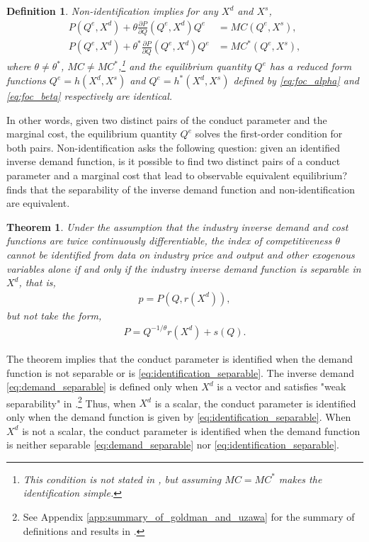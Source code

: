 \documentclass[11pt, a4paper]{article}
\newtheorem{theorem}{Theorem}
\newtheorem{definition}{Definition}
\theoremstyle{remark}
\begin{document}
\begin{definition}\label{def:non_identification}
Non-identification implies for any $X^{d}$ and $X^{s}$,
\begin{align}
P(Q^e, X^{d}) + \theta \frac{\partial P}{\partial Q}(Q^e, X^{d})Q^e &= MC(Q^e, X^{s}),  \label{eq:foc_alpha}\\
P(Q^e, X^{d}) + \theta^{*} \frac{\partial P}{\partial Q}(Q^e, X^{d})Q^e &= MC^{*}(Q^e, X^{s}),\label{eq:foc_beta}
\end{align}
where $\theta \neq \theta^{*}$, $MC \ne MC^{*}$,\footnote{This condition is not stated in \citet{lau1982identifying}, but assuming $MC = MC^{*}$ makes the identification simple.} and the equilibrium quantity $Q^e$ has a reduced form functions $Q^e = h(X^{d}, X^{s})$ and $Q^e = h^{*}(X^{d}, X^{s})$ defined by \eqref{eq:foc_alpha} and \eqref{eq:foc_beta} respectively are identical.
\end{definition}

In other words, given two distinct pairs of the conduct parameter and the marginal cost, the equilibrium quantity $Q^e$ solves the first-order condition for both pairs.
Non-identification asks the following question: given an identified inverse demand function, is it possible to find two distinct pairs of a conduct parameter and a marginal cost that lead to observable equivalent equilibrium?
\citet{lau1982identifying} finds that the separability of the inverse demand function and non-identification are equivalent.

\begin{theorem}\label{theorem_lau}
    Under the assumption that the industry inverse demand and cost functions are twice continuously differentiable, the index of competitiveness $\theta$ cannot be identified from data on industry price and output and other exogenous variables alone if and only if the industry inverse demand function is separable in $X^{d}$, that is,
    \begin{align}
        p = P(Q, r(X^{d})), \label{eq:demand_separable}
    \end{align}
    but not take the form, 
    \begin{align}
        P = Q^{-1/\theta}r(X^{d}) + s(Q). \label{eq:identification_separable}
    \end{align}
\end{theorem}
The theorem implies that the conduct parameter is identified when the demand function is not separable or is \eqref{eq:identification_separable}.
The inverse demand \eqref{eq:demand_separable} is defined only when $X^{d}$ is a vector and satisfies "weak separability" in \citet{goldmanNote1964}.\footnote{See Appendix \ref{app:summary_of_goldman_and_uzawa} for the summary of definitions and results in \citet{goldmanNote1964}.}
Thus, when $X^{d}$ is a scalar, the conduct parameter is identified only when the demand function is given by \eqref{eq:identification_separable}.
When $X^{d}$ is not a scalar, the conduct parameter is identified when the demand function is neither separable \eqref{eq:demand_separable} nor \eqref{eq:identification_separable}.
\end{document}
